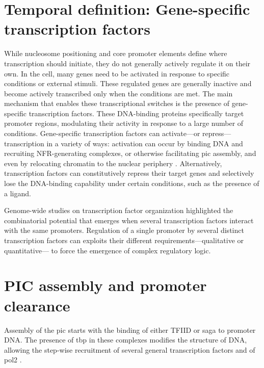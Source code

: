 \section{Temporal definition: Gene-specific transcription factors}
While nucleosome positioning and core promoter elements define where transcription should initiate, they do not generally actively regulate it on their own.  
In the cell, many genes need to be activated in response to specific conditions or external stimuli.
These regulated genes are generally inactive and become actively transcribed only when the conditions are met.
The main mechanism that enables these transcriptional switches is the presence of gene-specific transcription factors.
These DNA-binding proteins specifically target promoter regions, modulating their activity in response to a large number of conditions.
Gene-specific transcription factors can activate---or repress---transcription in a variety of ways: activation can occur by binding DNA and recruiting NFR-generating complexes, or otherwise facilitating \gls{pic} assembly, and even by relocating chromatin to the nuclear periphery \citep{randisehinchliff:2016:transcription}.
Alternatively, transcription factors can constitutively repress their target genes and selectively lose the DNA-binding capability under certain conditions, such as the presence of a ligand.

Genome-wide studies on transcription factor organization highlighted the combinatorial potential that emerges when several transcription factors interact with the same promoters\cite{harbison:2004:transcriptional}.
Regulation of a single promoter by several distinct transcription factors can exploits their different requirements---qualitative or quantitative--- to force the emergence of complex regulatory logic.

\section{PIC assembly and promoter clearance}
Assembly of the \acrlong{pic} starts with the binding of either TFIID or \gls{saga} to promoter DNA.
The presence of \gls{tbp} in these complexes modifies the structure of DNA, allowing the step-wise recruitment of several general transcription factors and of \gls{pol2} \citep[For review see][]{sainsbury:2015:structural}.

